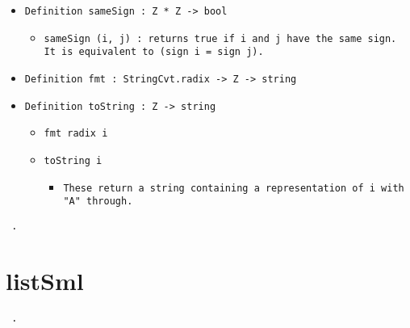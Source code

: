 \documentclass[11pt]{report}
\begin{document}
\begin{itemize}
\begin{itemize}
\end{itemize}

\item  \texttt{Definition sameSign : Z * Z -> bool}

\begin{itemize}
\item  \begin{flushleft} \texttt{sameSign (i, j) :  returns true if i and j have the same sign. It is equivalent to (sign i = sign j).} \end{flushleft}

\end{itemize}

\item  \texttt{Definition fmt : StringCvt.radix -> Z -> string}

\item  \texttt{Definition toString : Z -> string}

\begin{itemize}
\item  \texttt{fmt radix i}

\item  \texttt{toString i}

\begin{itemize}
\item  \texttt{These return a string containing a representation of i with "A" through. }
\end{itemize}

\end{itemize}

\end{itemize}
\begin{coqdoccode}
\coqdocemptyline
\coqdocemptyline
\coqdocnoindent
\texttt{ .\coqdoceol}
\end{coqdoccode}
\section*{listSml}

\begin{coqdoccode}
\coqdocemptyline
\coqdocnoindent
\texttt{ .\coqdoceol}
\coqdocemptyline
\end{coqdoccode}
\end{document}
